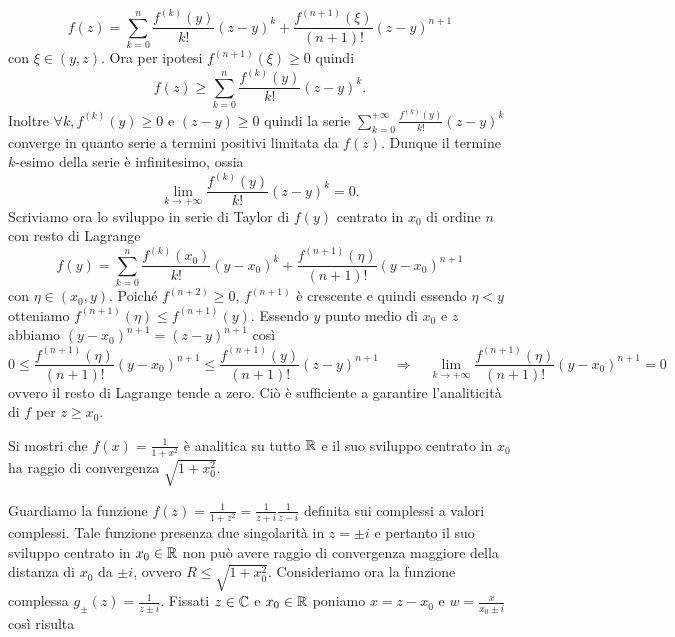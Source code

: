 \documentclass[a4paper]{article}\par \usepackage{style}\par
\begin{document}
\begin{equation*}
  f(z) = \sum_{k = 0}^{n} \frac{f^{(k)}(y)}{k!}(z - y)^k + \frac{f^{(n + 1)}(\xi)}{(n + 1)!}(z - y)^{n + 1}
\end{equation*}
con $ \xi \in (y, z) $. Ora per ipotesi $ f^{(n + 1)}(\xi) \geq 0 $ quindi
\begin{equation*}
  f(z) \geq \sum_{k = 0}^{n} \frac{f^{(k)}(y)}{k!}(z - y)^k.
\end{equation*}
Inoltre $ \forall k, f^{(k)}(y) \geq 0 $ e $ (z - y) \geq 0 $ quindi la serie $ \sum_{k = 0}^{+\infty} \frac{f^{(k)}(y)}{k!}(z - y)^k $ converge in quanto serie a termini positivi limitata da $ f(z) $. Dunque il termine $ k $-esimo della serie è infinitesimo, ossia
\begin{equation*}
  \lim_{k \to +\infty} \frac{f^{(k)}(y)}{k!}(z - y)^k = 0.
\end{equation*}
Scriviamo ora lo sviluppo in serie di Taylor di $ f(y) $ centrato in $ x_0 $ di ordine $ n $ con resto di Lagrange
\begin{equation*}
  f(y) = \sum_{k = 0}^{n} \frac{f^{(k)}(x_0)}{k!}(y - x_0)^k + \frac{f^{(n + 1)}(\eta)}{(n + 1)!}(y - x_0)^{n + 1}
\end{equation*}
con $ \eta \in (x_0, y) $. Poiché $ f^{(n + 2)} \geq 0 $, $ f^{(n + 1)} $ è crescente e quindi essendo $ \eta < y $ otteniamo $ f^{(n + 1)}(\eta) \leq f^{(n + 1)}(y) $. Essendo $ y $ punto medio di $ x_0 $ e $ z $ abbiamo $ (y - x_0)^{n + 1} = (z - y)^{n + 1} $ così
\begin{equation*}
  0 \leq \frac{f^{(n + 1)}(\eta)}{(n + 1)!}(y - x_0)^{n + 1} \leq \frac{f^{(n + 1)}(y)}{(n + 1)!}(z - y)^{n + 1} \quad \Rightarrow  \quad \lim_{k \to +\infty} \frac{f^{(n + 1)}(\eta)}{(n + 1)!}(y - x_0)^{n + 1} = 0
\end{equation*}
ovvero il resto di Lagrange tende a zero. Ciò è sufficiente a garantire l'analiticità di $ f $ per $ z \geq x_0 $.\par \begin{es}
  Si mostri che $ f(x) = \frac{1}{1 + x^2} $ è analitica su tutto $ \mathbb{R} $ e il suo sviluppo centrato in $ x_0 $ ha raggio di convergenza $ \sqrt{1 + x_0^2} $.
\end{es}\par Guardiamo la funzione $ f(z) = \frac{1}{1 + z^2} = \frac{1}{z + i} \frac{1}{z - i} $ definita sui complessi a valori complessi. Tale funzione presenza due singolarità in $ z = \pm i $ e pertanto il suo sviluppo centrato in $ x_0 \in \mathbb{R} $ non può avere raggio di convergenza maggiore della distanza di $ x_0 $ da $ \pm i $, ovvero $ R \leq \sqrt{1 + x_0^2} $. Consideriamo ora la funzione complessa $ g_{\pm}(z) = \frac{1}{z \pm i} $. Fissati $ z \in \mathbb{C} $ e $ x_0 \in \mathbb{R} $ poniamo $ x = z - x_0 $ e $ w = \frac{x}{x_0 \pm i} $ così risulta
\end{document}
